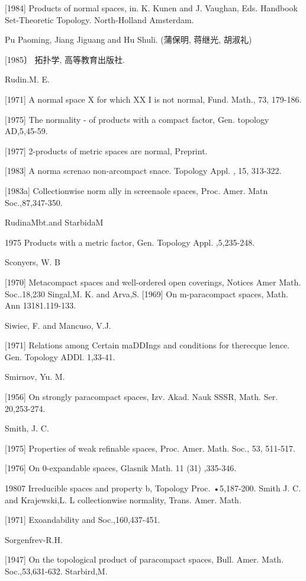 \documentclass[main.tex]{subfiles}
\begin{document}
{[1984]
	Products of normal spaces, in. K. Kunen and J. Vaughan, Eds.
	Handbook
	Set-Theoretic
	Topology.
	North-Holland
	Amsterdam.

\noindent Pu Paoming, Jiang Jiguang and Hu Shuli. (蒲保明, 蒋继光, 胡淑礼)
	
[1985〕 拓扑学, 高等教育出版社.

\noindent Rudin.M. E.

[1971]
	A normal space X for which XX I is not normal, Fund. Math., 73, 179-186.

[1975] The normality
	- of products with a compact
	factor, Gen. topology AD,5,45-59.

[1977]
	2-products of metric spaces are normal, Preprint.

[1983]
A norma screnao non-arcompact
snace. Topology
Appl. , 15,
313-322.

[1983a]
Collectionwise
norm
ally in screenaole spaces, Proc. Amer. Matn
Soc.,87,347-350.

\noindent RudinaMbt.and StarbidaM

1975 Products with a metric factor, Gen. Topology Appl. ,5,235-248.

\noindent Sconyers, W. B

[1970]
Metacompact spaces and well-ordered open coverings, Notices Amer
Math. Soc..18,230
Singal,M. K. and Arva,S.
[1969]
On m-paracompact spaces, Math. Ann
13181.119-133.

Siwiec, F. and Mancuso, V.J.

[1971]
Relations among
Certain maDDIngs and
conditions for therecque
lence. Gen. Topology ADDl. 1,33-41.

\noindent Smirnov, Yu. M.

[1956]
On strongly paracompact spaces, Izv. Akad. Nauk SSSR, Math. Ser.
20,253-274.

\noindent Smith, J. C.

[1975] Properties of weak refinable spaces, Proc. Amer. Math. Soc., 53,
511-517.

[1976] On 0-expandable spaces, Glasnik Math. 11 (31) ,335-346.

19807 Irreducible spaces and property b, Topology Proc.
•5,187-200.
Smith J. C. and Krajewski,L. L
collectionwise normality, Trans. Amer. Math.

[1971]
Exoandability and
Soc.,160,437-451.

\noindent Sorgenfrev-R.H.

[1947]
On the topological product of paracompact spaces, Bull. Amer. Math.
Soc.,53,631-632.
Starbird,M.

}
\end{document}
